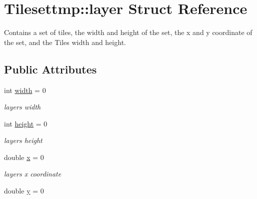 \hypertarget{structTilesettmp_1_1layer}{}\section{Tilesettmp\+:\+:layer Struct Reference}
\label{structTilesettmp_1_1layer}


Contains a set of tiles, the width and height of the set, the x and y coordinate of the set, and the Tiles width and height.  


\subsection*{Public Attributes}
\begin{DoxyCompactItemize}
\item 
int \hyperlink{structTilesettmp_1_1layer_a6fb9b7d5b76a8ed3f2ff5edd008cdc7c}{width} = 0\hypertarget{structTilesettmp_1_1layer_a6fb9b7d5b76a8ed3f2ff5edd008cdc7c}{}\label{structTilesettmp_1_1layer_a6fb9b7d5b76a8ed3f2ff5edd008cdc7c}

\begin{DoxyCompactList}\small\item\em layers width \end{DoxyCompactList}\item 
int \hyperlink{structTilesettmp_1_1layer_ac6eadc7b742a95e4ed8208c38aa1c21f}{height} = 0\hypertarget{structTilesettmp_1_1layer_ac6eadc7b742a95e4ed8208c38aa1c21f}{}\label{structTilesettmp_1_1layer_ac6eadc7b742a95e4ed8208c38aa1c21f}

\begin{DoxyCompactList}\small\item\em layers height \end{DoxyCompactList}\item 
double \hyperlink{structTilesettmp_1_1layer_a4d89ea5e7ff2a5454ad6eaf77267f1cd}{x} = 0\hypertarget{structTilesettmp_1_1layer_a4d89ea5e7ff2a5454ad6eaf77267f1cd}{}\label{structTilesettmp_1_1layer_a4d89ea5e7ff2a5454ad6eaf77267f1cd}

\begin{DoxyCompactList}\small\item\em layers x coordinate \end{DoxyCompactList}\item 
double \hyperlink{structTilesettmp_1_1layer_afbaea6aa498809b6de69423f62887c91}{y} = 0\hypertarget{structTilesettmp_1_1layer_afbaea6aa498809b6de69423f62887c91}{}\label{structTilesettmp_1_1layer_afbaea6aa498809b6de69423f62887c91}


\end{DoxyCompactItemize}
